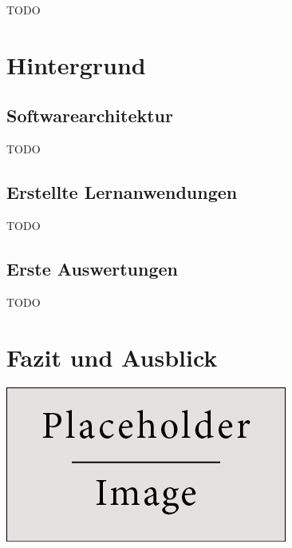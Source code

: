 \documentclass[a0,portrait]{a0poster}
\begin{document}
\begin{multicols}{2}
TODO

\section*{Hintergrund}

\subsection*{Softwarearchitektur}

TODO

\subsection*{Erstellte Lernanwendungen}

TODO

\subsection*{Erste Auswertungen}

TODO

\section*{Fazit und Ausblick}


\begin{center}\vspace{1cm}
\includegraphics[width=0.8\linewidth]{placeholder}
\end{center}\vspace{1cm}


\nocite{*} %


\end{multicols}
\end{document}
